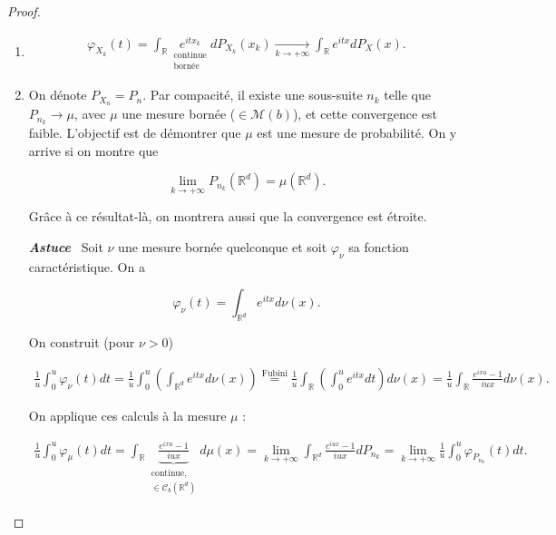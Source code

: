\documentclass[french]{book}
\theoremstyle{definition}
\theoremstyle{remark}
\newcommand{\biggg}{>}
\newcommand{\bg}{\biggg}
\begin{document}
\begin{proof}

  \

  \begin{enumerate}
    \item
      \begin{gather*}
        \varphi _{X_k}(t) = \int_{\mathbb{R}}^{} \underset{\substack{\text{continue} \\ \text{bornée}}}{e^{itx_k}} d P _{X_k}(x_k)  \underset{k \to +\infty }{\longrightarrow}  \int_{\mathbb{R}} e^{itx} d P_X(x).
      \end{gather*}

    \item On dénote \(P _{X_n} = P_n\). Par compacité, il existe une sous-suite \(n_k\) telle que \(P _{n_k} \longrightarrow \mu\), avec \(\mu\) une mesure bornée (\(\in \mathscr{M}(b)\)), et cette convergence est faible. L'objectif est de démontrer que \(\mu\) est une mesure de probabilité. On y arrive si on montre que

    \[\lim_{k \to +\infty} P _{n_k}(\mathbb{R}^d) = \mu(\mathbb{R}^d). \]

    Grâce à ce résultat-là, on montrera aussi que la convergence est étroite.

    \textbf{\emph{Astuce}} \ Soit \(\nu\) une mesure bornée quelconque et soit \(\varphi _{\nu}\) sa fonction caractéristique. On a

    \[\varphi _{\nu}(t) = \int_{\mathbb{R}^d} e^{itx} d \nu(x).\]

    On construit (pour \(\nu \bg 0\))

    \begin{gather*}
      \frac{1}{u} \int_{0}^{u} \varphi _{\nu}(t)dt = \frac{1}{u}\int_{0}^{u}\left(\int_{\mathbb{R}^d} e^{itx}d \nu(x)  \right) \stackrel{\text{Fubini}}{=} \frac{1}{u}\int_{\mathbb{R}} \left(\int_{0}^{u} e^{itx}dt  \right) d \nu(x)  = \frac{1}{u} \int_{\mathbb{R}} \frac{e^{ixu}-1 }{iux}d \nu(x).
    \end{gather*}

    On applique ces calculs à la mesure \(\mu\) :

    \begin{gather}
      \frac{1}{u} \int_{0}^{u} \varphi_\mu(t)dt = \int_{\mathbb{R}} \underbrace{\frac{e^{ixu}-1 }{iux}}_{\substack{\text{continue},\\\in \mathscr{C}_b(\mathbb{R}^d)}}d \mu(x)  = \lim_{k \to +\infty} \int_{\mathbb{R}^d} \frac{e^{iux}-1}{iux} d P _{n_k}  = \lim_{k \to+\infty} \frac{1}{u} \int_{0}^{u} \varphi_{P_{n_k}}(t)dt.  \label{equation45}
    \end{gather}


\end{enumerate}
\end{proof}
\end{document}
